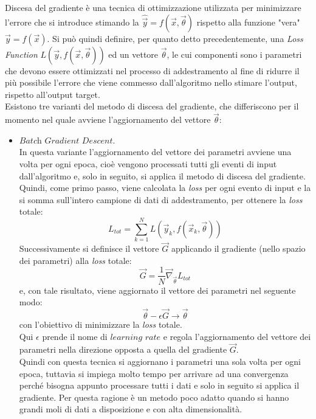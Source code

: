Discesa del gradiente è una tecnica di ottimizzazione utilizzata per minimizzare l'errore che si introduce stimando la $\hat{\vec{y}} = f(\vec{x},\vec{\theta})$ rispetto alla funzione "vera" $\vec{y} = f(\vec{x})$. Si può quindi definire, per quanto detto precedentemente, una \textit{Loss Function} $L(\vec{y},f(\vec{x},\vec{\theta}))$ ed un vettore $\vec{\theta}$, le cui componenti sono i parametri che devono essere ottimizzati nel processo di addestramento al fine di ridurre il più possibile l'errore che viene commesso dall'algoritmo nello stimare l'output, rispetto all'output target.\\
Esistono tre varianti del metodo di discesa del gradiente, che differiscono per il momento nel quale avviene l'aggiornamento del vettore $\vec{\theta}$:

\begin{itemize}
	\item $\textit{Batch Gradient Descent}$. \\
	In questa variante l'aggiornamento del vettore dei parametri avviene una volta per ogni epoca, cioè vengono processati tutti gli eventi di input dall'algoritmo e, solo in seguito, si applica il metodo di discesa del gradiente. Quindi, come primo passo, viene calcolata la \textit{loss} per ogni evento di input e la si somma sull'intero campione di dati di addestramento, per ottenere la \textit{loss} totale:
	\begin{equation}
		L_{tot} = \sum_{k=1}^{N} L(\vec{y}_k,f(\vec{x}_k,\vec{\theta}))
	\end{equation}
	Successivamente si definisce il vettore $\vec{G}$ applicando il gradiente (nello spazio dei parametri) alla \textit{loss} totale:
	\begin{equation}
		\vec{G} = \frac{1}{N}  \vec{\nabla}_{\vec{\theta}} L_{tot}
	\end{equation}
	e, con tale risultato, viene aggiornato il vettore dei parametri nel seguente modo:
	\begin{equation}
	\vec{\theta} - \epsilon\vec{G} \rightarrow \vec{\theta}
	\end{equation}
	con l'obiettivo di minimizzare la \textit{loss} totale.\\
	Qui $\epsilon$ prende il nome di $\textit{learning rate}$ e regola l'aggiornamento del vettore dei parametri nella direzione opposta a quella del gradiente $\vec{G}$.\\
	Quindi con questa tecnica si aggiornano i parametri una sola volta per ogni epoca, tuttavia si impiega molto tempo per arrivare ad una convergenza perché bisogna appunto processare tutti i dati e solo in seguito si applica il gradiente. Per questa ragione è un metodo poco adatto quando si hanno grandi moli di dati a disposizione e con alta dimensionalità. \\
	 

\end{itemize}
